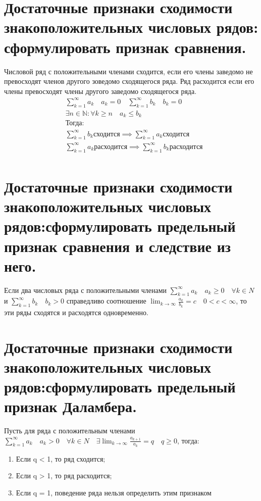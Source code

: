\documentclass{article}
\begin{document}
\section{Достаточные признаки сходимости знакоположительных числовых рядов: сформулировать признак сравнения.}
Числовой ряд с положительными членами сходится, если его члены заведомо не превосходят членов другого зоведомо сходящегося ряда. Ряд расходится если его члены превосходят члены другого заведомо сходящегося ряда.
\begin{equation}
\begin{aligned}
  &\sum_{k=1}^{\infty} a_k \quad a_k = 0 \quad \sum_{k=1}^{\infty} b_k \quad b_k = 0 \\
  &\exists n \in \mathbb{N} : \forall k \geq n \quad a_k \leq b_k \quad \\
  &\text{Тогда: } \\
  &\sum_{k=1}^{\infty} b_k \text{сходится} \implies \sum_{k=1}^{\infty} a_k \text{сходится} \\
  &\sum_{k=1}^{\infty} a_k \text{расходится} \implies \sum_{k=1}^{\infty} b_k \text{расходится} \\
\end{aligned}
\end{equation}
\section{Достаточные признаки сходимости знакоположительных числовых рядов:сформулировать предельный признак сравнения и следствие из него.}
Если два числовых ряда с положительными членами $\sum_{k=1}^{\infty} a_k \quad a_k  \geq 0 \quad \forall k \in N$ и $\sum_{k=1}^{\infty} b_k \quad b_k > 0$ справедливо соотношение $\lim_{k \to \infty} \frac{a_k}{b_k} = c \quad 0 < c < \infty $, то эти ряды сходятся и расходятся одновременно.
\section{Достаточные признаки сходимости знакоположительных числовых рядов:сформулировать предельный признак Даламбера.}
Пусть для ряда с положительным членами  $\sum_{k=1}^{\infty} a_k \quad a_k > 0 \quad \forall k \in N \quad \exists \lim_{k \to \infty} \frac{a_{k+1}}{a_k}  = q \quad q \geq 0 $, тогда:
\begin{enumerate}
\item Если q < 1, то ряд сходится;
\item Если q > 1, то ряд расходится;
\item Если q = 1, поведение ряда нельзя определить этим признаком
\end{enumerate}
\end{document}
